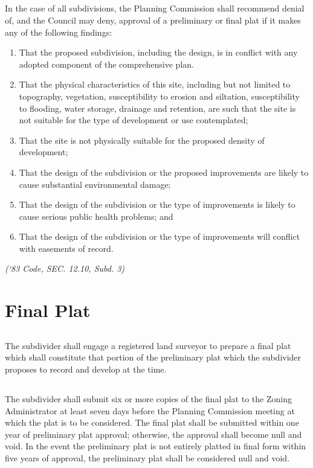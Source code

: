 \subsection{}
In the case of all subdivisions, the Planning Commission shall recommend denial of, and the Council may deny, approval of a preliminary or final plat if it makes any of the following findings:
\begin{enumerate}[{\indent}1)]
    \item That the proposed subdivision, including the design, is in conflict with any adopted component of the comprehensive plan.
    \item That the physical characteristics of this site, including but not limited to topography, vegetation, susceptibility to erosion and siltation, susceptibility to flooding, water storage, drainage and retention, are such that the site is not suitable for the type of development or use contemplated;
    \item That the site is not physically suitable for the proposed density of development;
    \item That the design of the subdivision or the proposed improvements are likely to cause substantial environmental damage;
    \item That the design of the subdivision or the type of improvements is likely to cause serious public health problems; and
    \item That the design of the subdivision or the type of improvements will conflict with easements of record.
\end{enumerate}
\emph{(‘83 Code, SEC. 12.10, Subd. 3)}
\section{Final Plat}
\subsection{}
The subdivider shall engage a registered land surveyor to prepare a final plat which shall constitute that portion of the preliminary plat which the subdivider proposes to record and develop at the time.
\subsection{}
The subdivider shall submit six or more copies of the final plat to the Zoning Administrator at least seven days before the Planning Commission meeting at which the plat is to be considered.  The final plat shall be submitted within one year of preliminary plat approval; otherwise, the approval shall become null and void.  In the event the preliminary plat is not entirely platted in final form within five years of approval, the preliminary plat shall be considered null and void.
